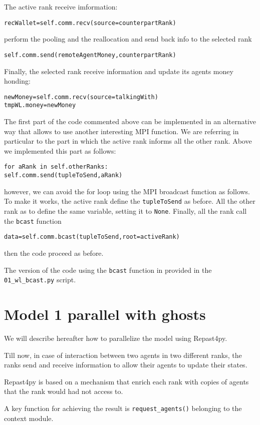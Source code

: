 \documentclass{article}
\begin{document}
The active rank receive imformation:
\begin{verbatim}
recWallet=self.comm.recv(source=counterpartRank)
\end{verbatim}
perform the pooling and the reallocation and send back info to the selected rank
\begin{verbatim}
self.comm.send(remoteAgentMoney,counterpartRank)
\end{verbatim}
Finally, the selected rank receive information and update its agents money honding:
\begin{verbatim}
newMoney=self.comm.recv(source=talkingWith)
tmpWL.money=newMoney
\end{verbatim}

The first part of the code commented above can be implemented in an alternative way that allows to use another interesting MPI function.
We are referring in particular to the part in which the active rank informs all the other rank. Above we implemented this part as follows:
\begin{verbatim}
for aRank in self.otherRanks:
self.comm.send(tupleToSend,aRank)
\end{verbatim}
however, we can avoid the for loop using the MPI broadcast function as follows.
To make it works, the active rank define the \verb+tupleToSend+ as before. All the other rank as to define the same variable, setting it to \verb+None+.
Finally, all the rank call the \verb+bcast+ function
\begin{verbatim}
data=self.comm.bcast(tupleToSend,root=activeRank)
\end{verbatim}
then the code proceed as before.

The version of the code using the \verb+bcast+ function in provided in the \verb+01_wl_bcast.py+ script.

\section{Model 1 parallel with ghosts}

We will describe hereafter how to parallelize the model using Repast4py.

Till now, in case of interaction between two agents in two different ranks, the ranks send and receive information to allow their agents to update their states.

Repast4py is based on a mechanism that enrich each rank with copies of agents that the rank would had not access to.

A key function for achieving the result is \verb+request_agents()+ belonging to the context module.
\end{document}
